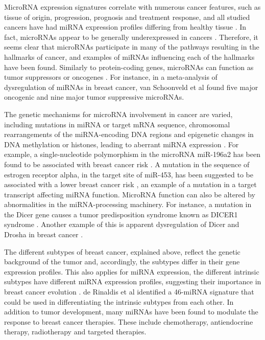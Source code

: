 MicroRNA expression signatures
correlate with numerous cancer features, such as tissue of origin, 
progression, prognosis and treatment response, and all studied cancers
have had miRNA expression profiles differing from healthy tissue
\citep{Calin2006}. In fact, microRNAs appear to be generally underexpressed in
cancers \citep{Lu2005}. Therefore, it seems clear that microRNAs participate
in many of the pathways resulting in the hallmarks of cancer, and
examples of miRNAs influencing each of the hallmarks have been found.
Similarly to protein-coding genes, microRNAs can function as tumor
suppressors or oncogenes \citep{Lin2015}. For instance, in a
meta-analysis of dysregulation of miRNAs in breast cancer, van Schoonveld
et al \citep{vanSchooneveld2015} found five major oncogenic and nine major tumor suppressive microRNAs.


The genetic mechanisms for microRNA involvement in cancer are varied,
including mutations in miRNA or target mRNA sequence, chromosomal
rearrangements of the miRNA-encoding DNA regions and epigenetic changes in DNA
methylation or histones, leading to aberrant miRNA expression
\citep{Calin2006,Melo2011}. For example, a single-nucleotide polymorphism
in the microRNA miR-196a2 has been found to be associated with breast cancer
risk \citep{Gao2011}. A mutation in the sequence of estrogen receptor alpha,
in the target site of miR-453, has been suggested to be associated with a
lower breast cancer risk \citep{Tchatchou2009}, an example of a mutation in
a target transcript affecting miRNA function. MicroRNA function can also be
altered by abnormalities in the miRNA-processing machinery. For instance, a
mutation in the Dicer gene causes a tumor predisposition syndrome known as
DICER1 syndrome \citep{Slade2011}. Another example of this is apparent
dysregulation of Dicer and Drosha in breast cancer \citep{Yan2012}.

The different subtypes of breast cancer, explained above, reflect the genetic
background of the tumor and, accordingly, the subtypes differ in their gene
expression profiles. This also applies for miRNA expression, the different
intrinsic subtypes have different miRNA expression profiles, suggesting their
importance in breast cancer evolution \citep{Blenkiron2007}.
de Rinaldis et al \citep{deRinaldis2013}
identified a 46-miRNA signature that could be used in differentiating the
intrinsic subtypes from each other. In addition to
tumor development, many miRNAs have been found to modulate the response to
breast cancer therapies. These include chemotherapy, antiendocrine therapy,
radiotherapy and targeted therapies.

